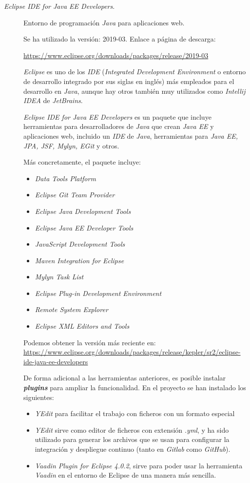 \begin{description}
	\item[\textit{Eclipse IDE for Java EE Developers}.] Entorno de programación \textit{Java} para aplicaciones web. 
	
		Se ha utilizado la versión: 2019-03. Enlace a página de descarga:
		
		\url{https://www.eclipse.org/downloads/packages/release/2019-03}
	
		\textit{Eclipse} es uno de los \textit{IDE} (\textit{Integrated Development Environment} o entorno de desarrollo integrado por sus siglas en inglés) más empleados para el desarrollo en \textit{Java}, aunque hay otros también muy utilizados como \textit{Intellij IDEA} de \textit{JetBrains}.
		
		\textit{Eclipse IDE for Java EE Developers} es un paquete que incluye herramientas para desarrolladores de \textit{Java} que crean \textit{Java EE} y aplicaciones web, incluido un \textit{IDE} de \textit{Java}, herramientas para \textit{Java EE, JPA, JSF, Mylyn, EGit} y otros.
		
Más concretamente, el paquete incluye:
\begin{itemize}
\item \textit{Data Tools Platform}
\item \textit{Eclipse Git Team Provider}
\item \textit{Eclipse Java Development Tools}
\item \textit{Eclipse Java EE Developer Tools}
\item \textit{JavaScript Development Tools}
\item \textit{Maven Integration for Eclipse}
\item \textit{Mylyn Task List}
\item \textit{Eclipse Plug-in Development Environment}
\item \textit{Remote System Explorer}
\item \textit{Eclipse XML Editors and Tools}
\end{itemize}

Podemos obtener la versión más reciente en: \url{https://www.eclipse.org/downloads/packages/release/kepler/sr2/eclipse-ide-java-ee-developers}
		
		De forma adicional a las herramientas anteriores, es posible instalar \textbf{\textit{plugins}} para ampliar la funcionalidad. En el proyecto se han instalado los siguientes:
	\begin{itemize}
		\item \textit{YEdit} para facilitar el trabajo con ficheros con un formato especial
		\item \textit{YEdit} sirve como editor de ficheros con extensión \textit{.yml}, y ha sido utilizado para generar los archivos que se usan para configurar la integración y despliegue continuo (tanto en \textit{Gitlab} como \textit{GitHub}).
		\item \textit{Vaadin Plugin for Eclipse 4.0.2}, sirve para poder usar la herramienta \textit{Vaadin} en el entorno de Eclipse de una manera más sencilla.
	\end{itemize}
		

\end{description}
